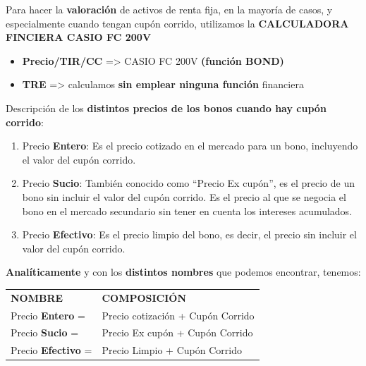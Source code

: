 \documentclass[
  letterpaper,
  DIV=11,
  numbers=noendperiod]{scrreprt}
\begin{document}
\begin{tcolorbox}
\begin{tcolorbox}[enhanced jigsaw, toprule=.15mm, left=2mm, arc=.35mm, breakable, bottomrule=.15mm, opacityback=0, rightrule=.15mm, leftrule=.75mm, colframe=quarto-callout-important-color-frame, colback=white]
\begin{minipage}[t]{5.5mm}
\textcolor{quarto-callout-important-color}{\faExclamation}
\end{minipage}%
\begin{minipage}[t]{\textwidth - 5.5mm}

Para hacer la \textbf{valoración} de activos de renta fija, en la
mayoría de casos, y especialmente cuando tengan cupón corrido,
utilizamos la \textbf{CALCULADORA FINCIERA CASIO FC 200V}

\begin{itemize}
\item
  \textbf{Precio/TIR/CC} =\textgreater{} CASIO FC 200V \textbf{(función
  BOND)}
\item
  \textbf{TRE} =\textgreater{} calculamos \textbf{sin emplear ninguna
  función} financiera
\end{itemize}

\end{minipage}%
\end{tcolorbox}

Descripción de los \textbf{distintos precios de los bonos cuando hay
cupón corrido}:

\begin{enumerate}
\def\labelenumi{\arabic{enumi}.}
\item
  Precio \textbf{Entero}: Es el precio cotizado en el mercado para un
  bono, incluyendo el valor del cupón corrido.
\item
  Precio \textbf{Sucio}: También conocido como ``Precio Ex cupón'', es
  el precio de un bono sin incluir el valor del cupón corrido. Es el
  precio al que se negocia el bono en el mercado secundario sin tener en
  cuenta los intereses acumulados.
\item
  Precio \textbf{Efectivo}: Es el precio limpio del bono, es decir, el
  precio sin incluir el valor del cupón corrido.
\end{enumerate}

\textbf{Analíticamente} y con los \textbf{distintos nombres} que podemos
encontrar, tenemos:

\begin{longtable}[]{@{}ll@{}}
\toprule\noalign{}
\endhead
\bottomrule\noalign{}
\endlastfoot
\textbf{NOMBRE} & \textbf{COMPOSICIÓN} \\
Precio \textbf{Entero} = & Precio cotización + Cupón Corrido \\
Precio \textbf{Sucio} = & Precio Ex cupón + Cupón Corrido \\
Precio \textbf{Efectivo} = & Precio Limpio + Cupón Corrido \\
\end{longtable}


\end{tcolorbox}
\end{document}
